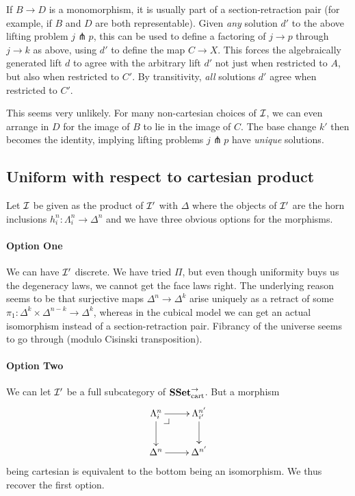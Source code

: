 \documentclass[reqno,10pt,a4paper,oneside]{amsart}
\begin{document}
If $B \to D$ is a monomorphism, it is usually part of a section-retraction pair (for example, if $B$ and $D$ are both representable).
Given \emph{any} solution $d'$ to the above lifting problem $j \pitchfork p$, this can be used to define a factoring of $j \to p$ through $j \to k$ as above, using $d'$ to define the map $C \to X$.
This forces the algebraically generated lift $d$ to agree with the arbitrary lift $d'$ not just when restricted to $A$, but also when restricted to $C'$.
By transitivity, \emph{all} solutions $d'$ agree when restricted to $C'$.

This seems very unlikely.
For many non-cartesian choices of $\cal{I}$, we can even arrange in $D$ for the image of $B$ to lie in the image of $C$.
The base change $k'$ then becomes the identity, implying lifting problems $j \pitchfork p$ have \emph{unique} solutions.

\subsection*{Uniform with respect to cartesian product}

Let $\cal{I}$ be given as the product of $\cal{I'}$ with $\Delta$ where the objects of $\cal{I'}$ are the horn inclusions $h_i^n : \Lambda_i^n \to \Delta^n$ and we have three obvious options for the morphisms.

\paragraph{Option One}

We can have $\cal{I'}$ discrete.
We have tried $\Pi$, but even though uniformity buys us the degeneracy laws, we cannot get the face laws right.
The underlying reason seems to be that surjective maps $\Delta^n \to \Delta^k$ arise uniquely as a retract of some $\pi_1 : \Delta^k \times \Delta^{n-k} \to \Delta^k$, whereas in the cubical model we can get an actual isomorphism instead of a section-retraction pair.
Fibrancy of the universe seems to go through (modulo Cisinski transposition).

\paragraph{Option Two}

We can let $\cal{I'}$ be a full subcategory of $\SSet_{\text{cart}}^{\to}$.
But a morphism
\[
\xymatrix{
  \Lambda_i^n
  \ar[r]
  \ar[d]
  \pullback{dr}
&
  \Lambda_{i'}^{n'}
  \ar[d]
\\
  \Delta^n
  \ar[r]
&
  \Delta^{n'}
}
\]
being cartesian is equivalent to the bottom being an isomorphism.
We thus recover the first option.
\end{document}
